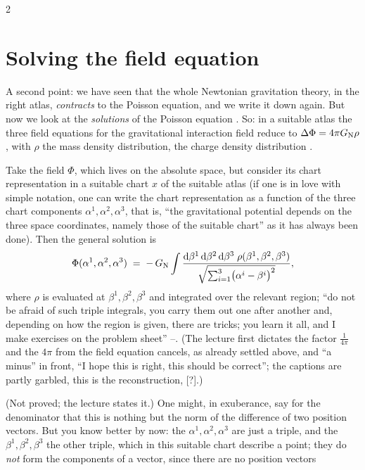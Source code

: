 \begin{paracol}{2}
\section{Solving the field equation}\label{sec:ng-solution}

A second point: we have seen that the whole Newtonian gravitation theory, in the right atlas, \emph{contracts} to the Poisson equation, and we write it down again. But now we look at the \emph{solutions} of the Poisson equation . So: in a suitable atlas the three field equations for the gravitational interaction field reduce to $\Delta\Phi=4\pi G_{\rm N}\rho$, with $\rho$ the mass density distribution, the charge density distribution .

\begin{theorem}\label{thm:ng-solution}
Take the field $\Phi$, which lives on the absolute space, but consider its chart representation in a suitable chart $x$ of the suitable atlas (if one is in love with simple notation, one can write the chart representation as a function of the three chart components $\alpha^1,\alpha^2,\alpha^3$, that is, ``the gravitational potential depends on the three space coordinates, namely those of the suitable chart'' as it has always been done).
Then the general solution is
\begin{equation}\label{eq:ng-solution}
  \Phi(\alpha^1,\alpha^2,\alpha^3)\;=\;-\,G_{\rm N}\int\frac{\mathrm d\beta^1\,\mathrm d\beta^2\,\mathrm d\beta^3\;\rho(\beta^1,\beta^2,\beta^3)}{\sqrt{\sum_{i=1}^3\bigl(\alpha^i-\beta^i\bigr)^2}} ,
\end{equation}
where $\rho$ is evaluated at $\beta^1,\beta^2,\beta^3$ and integrated over the relevant region; ``do not be afraid of such triple integrals, you carry them out one after another and, depending on how the region is given, there are tricks; you learn it all, and I make exercises on the problem sheet'' --. (The lecture first dictates the factor $\tfrac1{4\pi}$ and the $4\pi$ from the field equation cancels, as already settled above, and ``a minus'' in front,
``I hope this is right, this should be correct''; the captions are partly garbled, this is the reconstruction, [?].)
\end{theorem}
(Not proved; the lecture states it.) One might, in exuberance, say for the denominator that this is nothing but the norm of the difference of two position vectors. But you know better by now: the $\alpha^1,\alpha^2,\alpha^3$ are just a triple, and the $\beta^1,\beta^2,\beta^3$ the other triple, which in this suitable chart describe a point; they do \emph{not} form the components of a vector, since there are no position vectors

\end{paracol}

